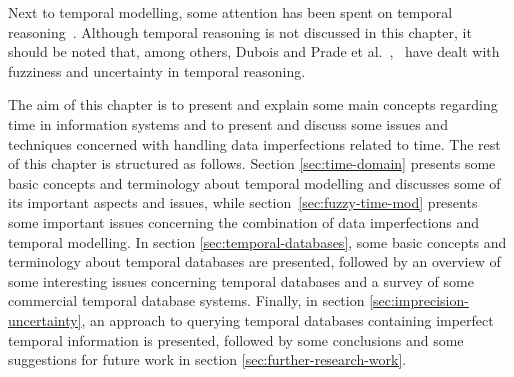 Next to temporal modelling, some attention has been spent on temporal reasoning~\cite{Allen83}. Although temporal reasoning is not discussed in this chapter, it should be noted that, among others, Dubois and Prade et al.~\cite{Dubois:jucs_9_9:fuzziness_and_uncertainty_in},~\cite{Dubois89} have dealt with fuzziness and uncertainty in temporal reasoning.

The aim of this chapter is to present and explain some main concepts regarding time in information systems and to present and discuss some issues and techniques concerned with handling data imperfections related to time. The rest of this chapter is structured as follows. Section \ref{sec:time-domain} presents some basic concepts and terminology about temporal modelling and discusses some of its important aspects and issues, while section~\ref{sec:fuzzy-time-mod} presents some important issues concerning the combination of data imperfections and temporal modelling. In section \ref{sec:temporal-databases}, some basic concepts and terminology about temporal databases are presented, followed by an overview of some interesting issues concerning temporal databases and a survey of some commercial temporal database systems. Finally, in section \ref{sec:imprecision-uncertainty}, an approach to querying temporal databases containing imperfect temporal information is presented, followed by some conclusions and some suggestions for future work in section \ref{sec:further-research-work}.




